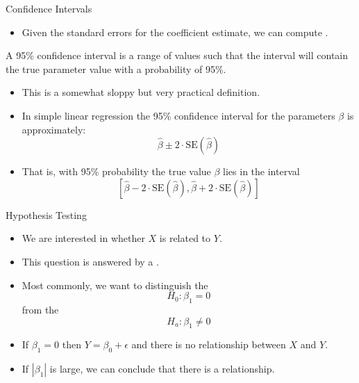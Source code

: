 \documentclass[mathserif, aspectratio=169]{beamer}
\begin{document}
\begin{frame}{Confidence Intervals}
	\begin{itemize}
		\item Given the standard errors for the coefficient estimate, we can compute .
	\end{itemize}
			\begin{cpage}\orange
				A 95\% confidence interval is a range of values such that the interval will contain
				the true parameter value with a probability of 95\%.
			\end{cpage}
	\begin{itemize}
		\item This is a somewhat sloppy but very practical definition.
		\item In simple linear regression the 95\% confidence interval for the parameters $\beta$ is
			approximately:
				\[ \hat{\beta} \pm 2\cdot\text{SE}(\hat{\beta}) \]
		\item That is, with 95\% probability the true value $\beta$ lies in the interval
			\[
				\left[ \hat{\beta} - 2\cdot\text{SE}(\hat{\beta}),  \hat{\beta} + 2\cdot\text{SE}(\hat{\beta})\right]
			\]
	\end{itemize}
\end{frame}

\begin{frame}{Hypothesis Testing}
	\begin{itemize}
		\item We are interested in whether $X$ is related to $Y$.
		\item This question is answered by a .
		\item Most commonly, we want to distinguish the 
			\[ H_0 : \beta_1 = 0 \]
			from the 
			\[ H_a : \beta_1 \ne 0 \]
		\item If $\beta_1 = 0$ then $Y = \beta_0 +\epsilon$ and there is no relationship between
			$X$ and $Y$.
		\item If $|\beta_1|$ is large, we can conclude that there is a relationship.
	\end{itemize}
\end{frame}
\end{document}

